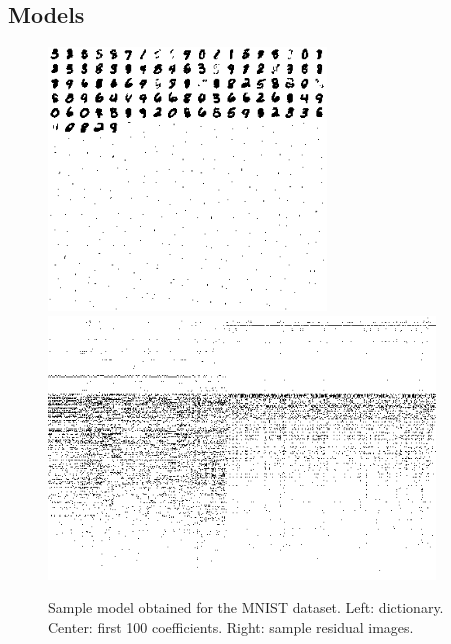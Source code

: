 \documentclass[twocolumn]{IEEEtran}
\theoremstyle{definition}
\begin{document}
\subsection{Models}

\begin{figure}[t]
\includegraphics[height=2.75in]{fig/mnist_mob_dict.png}\hspace{2ex}%
\includegraphics[height=2.75in]{fig/mnist_mob_coef_crop.png}%
\caption{\label{fig:mnist-mob} Sample model obtained for the MNIST dataset. Left: dictionary. Center: first 100 coefficients. Right: sample residual images. }
\end{figure}
%
\end{document}
